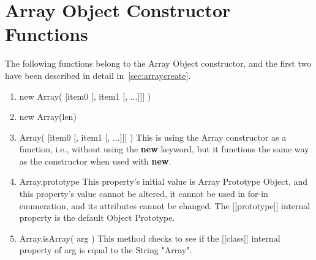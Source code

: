 \documentclass[a4paper,11pt,twoside]{report}
\begin{document}
\section{Array Object Constructor Functions}
The following functions belong to the Array Object constructor, and the first two have been described in detail in~\ref{sec:arraycreate}.
\begin{enumerate}
\item new Array( [item0 [, item1 [, ...]]] )
\item new Array(len)
\item Array( [item0 [, item1 [, ...]]] ) \newline
This is using the Array constructor as a function, i.e., without using the \textbf{new} keyword, but it functions the same way as the constructor when used with \textbf{new}.
\item Array.prototype \newline
This property's initial value is Array Prototype Object, and this property's value cannot be altered, it cannot be used in for-in enumeration, and its attributes cannot be changed. The [[prototype]] internal property is the default Object Prototype.
\item Array.isArray( arg ) \newline
This method checks to see if the [[class]] internal property of arg is equal to the String "Array".
\end{enumerate}
\end{document}
